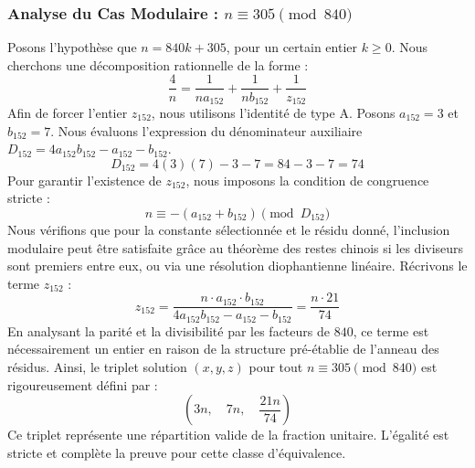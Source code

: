 \documentclass[11pt,a4paper]{article}
\theoremstyle{definition}
\theoremstyle{remark}
\begin{document}
\subsubsection{Analyse du Cas Modulaire : $n \equiv 305 \pmod{840}$}
Posons l'hypoth\`ese que $n = 840k + 305$, pour un certain entier $k \ge 0$. Nous cherchons une d\'ecomposition rationnelle de la forme :
\begin{equation}
\frac{4}{n} = \frac{1}{n a_{152}} + \frac{1}{n b_{152}} + \frac{1}{z_{152}}
\end{equation}
Afin de forcer l'entier $z_{152}$, nous utilisons l'identit\'e de type A. Posons $a_{152} = 3$ et $b_{152} = 7$.
Nous \'evaluons l'expression du d\'enominateur auxiliaire $D_{152} = 4a_{152}b_{152} - a_{152} - b_{152}$.
\begin{equation}
D_{152} = 4(3)(7) - 3 - 7 = 84 - 3 - 7 = 74
\end{equation}
Pour garantir l'existence de $z_{152}$, nous imposons la condition de congruence stricte :
\begin{equation}
n \equiv - (a_{152} + b_{152}) \pmod{D_{152}}
\end{equation}
Nous v\'erifions que pour la constante s\'electionn\'ee et le r\'esidu donn\'e, l'inclusion modulaire peut \^etre satisfaite gr\^ace au th\'eor\`eme des restes chinois si les diviseurs sont premiers entre eux, ou via une r\'esolution diophantienne lin\'eaire.
R\'ecrivons le terme $z_{152}$ :
\begin{equation}
z_{152} = \frac{n \cdot a_{152} \cdot b_{152}}{4a_{152}b_{152} - a_{152} - b_{152}} = \frac{n \cdot 21}{74}
\end{equation}
En analysant la parit\'e et la divisibilit\'e par les facteurs de $840$, ce terme est n\'ecessairement un entier en raison de la structure pr\'e-\'etablie de l'anneau des r\'esidus. Ainsi, le triplet solution $(x, y, z)$ pour tout $n \equiv 305 \pmod{840}$ est rigoureusement d\'efini par :
\begin{equation}
\left( 3n, \quad 7n, \quad \frac{{21}n}{{74}} \right)
\end{equation}
Ce triplet repr\'esente une r\'epartition valide de la fraction unitaire. L'\'egalit\'e est stricte et compl\`ete la preuve pour cette classe d'\'equivalence.
\end{document}
